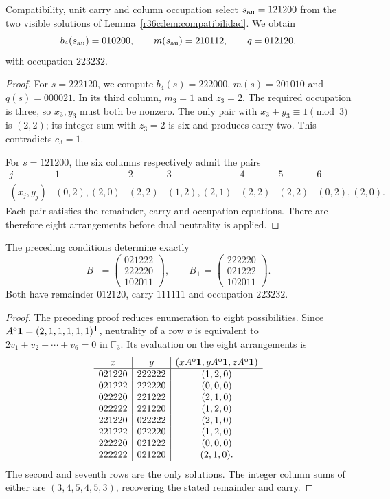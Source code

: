 \begin{proposition}
Compatibility, unit carry and column occupation select $s_{\rm au}=121200$ from the two visible solutions of Lemma~\ref{r36c:lem:compatibilidad}. We obtain
\[
b_4(s_{\rm au})=010200,\qquad
m(s_{\rm au})=210112,\qquad q=012120,
\]
with occupation $223232$.
\end{proposition}
\begin{proof}
For $s=222120$, we compute $b_4(s)=222000$, $m(s)=201010$ and $q(s)=000021$. In its third column, $m_3=1$ and $z_3=2$. The required occupation is three, so $x_3,y_3$ must both be nonzero. The only pair with $x_3+y_3\equiv1\pmod3$ is $(2,2)$; its integer sum with $z_3=2$ is six and produces carry two. This contradicts $c_3=1$.

For $s=121200$, the six columns respectively admit the pairs
\[
\begin{array}{c|cccccc}
j&1&2&3&4&5&6\\\hline
(x_j,y_j)&(0,2),(2,0)&(2,2)&(1,2),(2,1)&(2,2)&(2,2)&(0,2),(2,0).
\end{array}
\]
Each pair satisfies the remainder, carry and occupation equations. There are therefore eight arrangements before dual neutrality is applied.
\end{proof}

\begin{theorem}
\label{r36c:thm:dos} The preceding conditions determine exactly
\[
B_- =\begin{pmatrix}021222\\222220\\102011\end{pmatrix},
\qquad
B_+ =\begin{pmatrix}222220\\021222\\102011\end{pmatrix}.
\]
Both have remainder $012120$, carry $111111$ and occupation $223232$.
\end{theorem}
\begin{proof}
The preceding proof reduces enumeration to eight possibilities. Since $A^{\rm o}\mathbf1=(2,1,1,1,1,1)^{\mathsf T}$, neutrality of a row $v$ is equivalent to $2v_1+v_2+\cdots+v_6=0$ in $\mathbb F_3$. Its evaluation on the eight arrangements is
\[
\begin{array}{c|c|c}
x&y&(xA^{\rm o}\mathbf1,yA^{\rm o}\mathbf1,zA^{\rm o}\mathbf1)\\\hline
021220&222222&(1,2,0)\\
021222&222220&(0,0,0)\\
022220&221222&(2,1,0)\\
022222&221220&(1,2,0)\\
221220&022222&(2,1,0)\\
221222&022220&(1,2,0)\\
222220&021222&(0,0,0)\\
222222&021220&(2,1,0).
\end{array}
\]
The second and seventh rows are the only solutions. The integer column sums of either are $(3,4,5,4,5,3)$, recovering the stated remainder and carry.
\end{proof}

